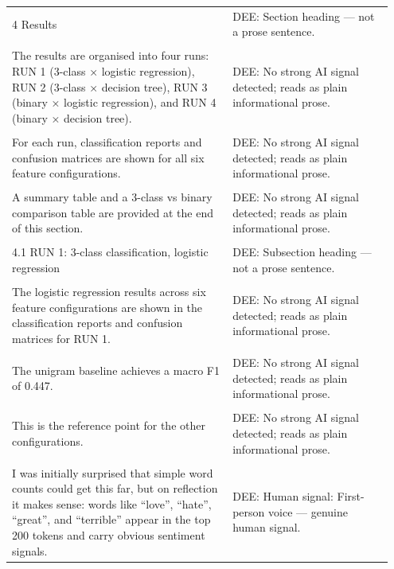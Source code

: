 \documentclass[11pt]{article}
\begin{document}
\begin{longtable}{|p{0.55\linewidth}|p{0.40\linewidth}|}
\hline
\rule{0pt}{3.5cm} & \\
\hline
4 Results & DEE: Section heading --- not a prose sentence. \\[2pt]
\hline
\rule{0pt}{3.5cm} & \\
\hline
The results are organised into four runs: RUN 1 (3-class × logistic regression), RUN 2 (3-class × decision tree), RUN 3 (binary × logistic regression), and RUN 4 (binary × decision tree). & DEE: No strong AI signal detected; reads as plain informational prose. \\[2pt]
\hline
\rule{0pt}{3.5cm} & \\
\hline
For each run, classification reports and confusion matrices are shown for all six feature configurations. & DEE: No strong AI signal detected; reads as plain informational prose. \\[2pt]
\hline
\rule{0pt}{3.5cm} & \\
\hline
A summary table and a 3-class vs binary comparison table are provided at the end of this section. & DEE: No strong AI signal detected; reads as plain informational prose. \\[2pt]
\hline
\rule{0pt}{3.5cm} & \\
\hline
4.1 RUN 1: 3-class classification, logistic regression & DEE: Subsection heading --- not a prose sentence. \\[2pt]
\hline
\rule{0pt}{3.5cm} & \\
\hline
The logistic regression results across six feature configurations are shown in the classification reports and confusion matrices for RUN 1. & DEE: No strong AI signal detected; reads as plain informational prose. \\[2pt]
\hline
\rule{0pt}{3.5cm} & \\
\hline
The unigram baseline achieves a macro F1 of 0.447. & DEE: No strong AI signal detected; reads as plain informational prose. \\[2pt]
\hline
\rule{0pt}{3.5cm} & \\
\hline
This is the reference point for the other configurations. & DEE: No strong AI signal detected; reads as plain informational prose. \\[2pt]
\hline
\rule{0pt}{3.5cm} & \\
\hline
I was initially surprised that simple word counts could get this far, but on reflection it makes sense: words like ``love'', ``hate'', ``great'', and ``terrible'' appear in the top 200 tokens and carry obvious sentiment signals. & DEE: Human signal: First-person voice --- genuine human signal. \\[2pt]

\end{longtable}
\end{document}
